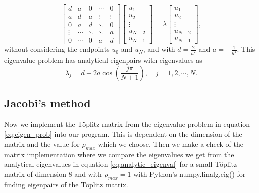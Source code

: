 \documentclass[12pt,a4paper,english]{article}
\begin{document}
\begin{equation}
\label{eq:eigen_prob}
\begin{bmatrix}
d & a & 0 & \cdots & 0\\
a & d & a &\vdots & \vdots\\
0 & a & d & \ddots & 0\\
\vdots & \cdots & \ddots & \ddots & a\\
0 & \cdots & 0 & a & d
\end{bmatrix}
\begin{bmatrix}
u_1\\
u_2\\
\vdots\\
u_{N-2}\\
u_{N-1}
\end{bmatrix} = \lambda
\begin{bmatrix}
u_1\\
u_2\\
\vdots\\
u_{N-2}\\
u_{N-1}
\end{bmatrix},
\end{equation}
without considering the endpoints $u_0$ and $u_N$, and with $d=\frac{2}{h^2}$ and $a=-\frac{1}{h^2}$. This eigenvalue problem has analytical eigenpairs with eigenvalues as
\begin{equation}
\label{eq:analytic_eigenval}
\lambda_j = d+2a\cos(\frac{j\pi}{N+1}),\quad j=1,2,\cdots,N.
\end{equation}

\subsection{Jacobi's method}
\label{sect:Jacobi}
Now we implement the Töplitz matrix from the eigenvalue problem in equation \ref{eq:eigen_prob} into our program. This is dependent on the dimension of the matrix and the value for $\rho_{max}$ which we choose. Then we make a check of the matrix implementation where we compare the eigenvalues we get from the analytical eigenvalues in equation \ref{eq:analytic_eigenval} for a small Töplitz matrix of dimension 8 and with $\rho_{max}=1$ with Python's numpy.linalg.eig() for finding eigenpairs of the Töplitz matrix.
\end{document}
